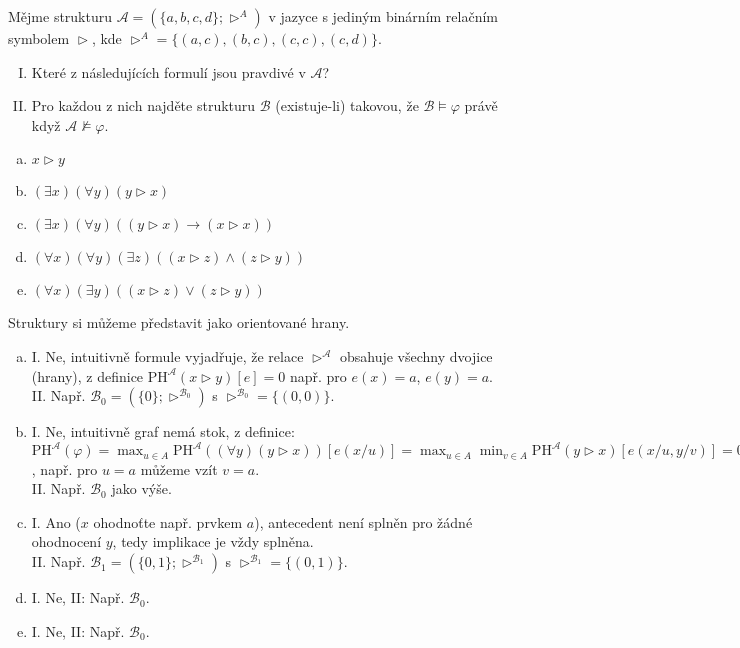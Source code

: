 \begin{problem}

    Mějme strukturu $\mathcal{A}=(\{a,b,c,d\};\vartriangleright^{A})$ v jazyce s jediným binárním relačním symbolem $\vartriangleright$, kde $\vartriangleright^{A}=\{(a,c), (b,c), (c,c), (c,d)\}$. 
    \begin{enumerate}[I.]
        \item Které z následujících formulí jsou pravdivé v $\mathcal A$? 
        \item Pro každou z nich najděte strukturu $\mathcal{B}$ (existuje-li) takovou, že $\mathcal{B}\models \varphi$ právě když $\mathcal{A}\not\models \varphi$.
    \end{enumerate}    
    \begin{enumerate}[(a)]
       \item $x \vartriangleright y$
       \item $(\exists x)(\forall y)(y \vartriangleright x)$
       \item $(\exists x)(\forall y)((y \vartriangleright x) \to (x \vartriangleright x))$
       \item $(\forall x)(\forall y)(\exists z)((x \vartriangleright z)\wedge(z \vartriangleright y))$
       \item $(\forall x)(\exists y)((x \vartriangleright z)\vee(z \vartriangleright y))$
    \end{enumerate}

    \begin{solution}

        Struktury si můžeme představit jako orientované hrany.
        \begin{enumerate}[(a)]
            \item I. Ne, intuitivně formule vyjadřuje, že relace  $\vartriangleright^\mathcal A$ obsahuje všechny dvojice (hrany), z definice $\mathrm{PH}^\mathcal A(x \vartriangleright y)[e]=0$ např. pro $e(x)=a$, $e(y)=a$.\\            
            II. Např. $\mathcal B_0=(\{0\};\vartriangleright^{\mathcal B_0})$ s $\vartriangleright^{\mathcal B_0}=\{(0,0)\}$.
            \item I. Ne, intuitivně graf nemá stok, z definice: $\mathrm{PH}^\mathcal A(\varphi)=\max_{u\in A}\mathrm{PH}^\mathcal A((\forall y)(y \vartriangleright x))[e(x/u)]=\max_{u\in A}\min_{v\in A}\mathrm{PH}^\mathcal A(y \vartriangleright x)[e(x/u,y/v)]=0$, např. pro $u=a$ můžeme vzít $v=a$.\\
            II. Např. $\mathcal B_0$ jako výše.
            \item I. Ano ($x$ ohodnoťte např. prvkem $a$), antecedent není splněn pro žádné ohodnocení $y$, tedy implikace je vždy splněna.\\
            II. Např. $\mathcal B_1=(\{0,1\};\vartriangleright^{\mathcal B_1})$ s $\vartriangleright^{\mathcal B_1}=\{(0,1)\}$.
            \item I. Ne, II: Např. $\mathcal B_0$.
            \item I. Ne, II: Např. $\mathcal B_0$.  
        \end{enumerate}
        

\end{solution}
\end{problem}
